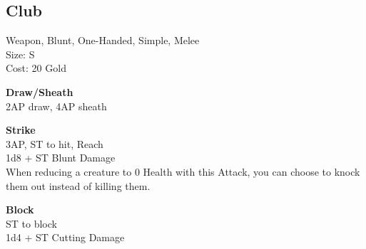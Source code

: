 \subsection{Club}\label{weapon:club}
Weapon, Blunt, One-Handed, Simple, Melee\\
Size: S\\
Cost: 20 Gold

\textbf{Draw/Sheath}\\
2AP draw, 4AP sheath

\textbf{Strike}\\
3AP, ST to hit,  Reach\\
1d8 + \texttimes ST Blunt Damage\\
When reducing a creature to 0 Health with this Attack, you can choose to knock them out instead of killing them.

\textbf{Block}\\
ST to block\\
1d4 + \texttimes ST Cutting Damage

